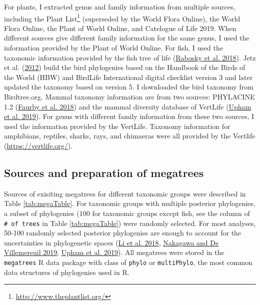 \documentclass[
  12pt,
]{article}
\DeclareRobustCommand{\href}[2]{#2\footnote{\url{#1}}}
\begin{document}
For plants, I extracted genus and family information from multiple sources, including \href{http://www.theplantlist.org/}{the Plant List} (superseded by the World Flora Online), the World Flora Online, the Plant of World Online, and Catelogue of Life 2019. When different sources give different family information for the same genus, I used the information provided by the Plant of World Online. For fish, I used the taxonomic information provided by the fish tree of life (\protect\hyperlink{ref-rabosky2018inverse}{Rabosky et al. 2018}). Jetz et al. (\protect\hyperlink{ref-jetz2012global}{2012}) build the bird phylogenies based on the Handbook of the Birds of the World (HBW) and BirdLife International digital checklist version 3 and later updated the taxonomy based on version 5. I downloaded the bird taxonomy from Birdtree.org. Mammal taxonomy information are from two sources: PHYLACINE 1.2 (\protect\hyperlink{ref-faurby2018phylacine}{Faurby et al. 2018}) and the mammal diversity database of VertLife (\protect\hyperlink{ref-upham2019inferring}{Upham et al. 2019}). For genus with different family information from these two sources, I used the information provided by the VertLife. Taxonomy information for amphibians, reptiles, sharks, rays, and chimaeras were all provided by the Vertlife (\url{https://vertlife.org/}).

\hypertarget{sources-and-preparation-of-megatrees}{%
\subsection{Sources and preparation of megatrees}\label{sources-and-preparation-of-megatrees}}

Sources of exisiting megatrees for different taxonomic groups were described in Table \ref{tab:megaTable}. For taxonomic groups with multiple posterior phylogenies, a subset of phylogenies (100 for taxonomic groups except fish, see the column of \texttt{\#\ of\ trees} in Table \ref{tab:megaTable}) were randomly selected. For most analyses, 50-100 randomly selected posterior phylogenies are enough to account for the uncertainties in phylogenetic spaces (\protect\hyperlink{ref-li2018species}{Li et al. 2018}, \protect\hyperlink{ref-nakagawa2019general}{Nakagawa and De Villemereuil 2019}, \protect\hyperlink{ref-upham2019inferring}{Upham et al. 2019}). All megatrees were stored in the \texttt{megatrees} R data package with class of \texttt{phylo} or \texttt{multiPhylo}, the most common data structures of phylogenies used in R.
\end{document}
